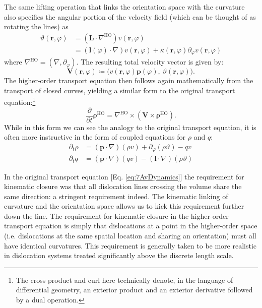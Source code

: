 The same lifting operation that links the orientation space with the
curvature also specifies the angular portion of the velocity field (which can be thought of as rotating the lines) as
\begin{align}
    \vartheta\left( \boldsymbol{r},\varphi \right) &= \left( \boldsymbol{L}\cdot\nabla^\text{HO} \right)v\left( \boldsymbol{r},\varphi \right)\\
    &= (\boldsymbol{l}(\varphi)\cdot\nabla)v\left( \boldsymbol{r},\varphi \right)+\kappa\left( \boldsymbol{r},\varphi \right)\partial_{\varphi}v\left( \boldsymbol{r},\varphi \right)
\end{align}
where \(\nabla^\text{HO} = \left( \nabla,\partial_{\varphi} \right)\). The
resulting total velocity vector is given by:
\begin{equation}\boldsymbol{V}\left( \boldsymbol{r},\varphi \right) \coloneqq \Big( v\left( \boldsymbol{r},\varphi \right)\boldsymbol{p}(\varphi),\ \vartheta\left( \boldsymbol{r},\varphi \right) \Big).\end{equation}
The higher-order transport equation then follows again mathematically
from the transport of closed curves, yielding a similar form to the
original transport equation:\footnote{The cross product and curl here technically denote, in the language of differential geometry, an exterior product and an exterior derivative followed by a dual operation.}
\begin{equation}
\frac{\partial}{\partial t}\boldsymbol{\rho}^\text{HO}=\nabla^\text{HO}\times\left( \boldsymbol{V} \times\boldsymbol{\rho}^\text{HO} \right).
\end{equation}
While in this form we can see the analogy to the original transport
equation, it is often more instructive in the form of coupled equations
for \(\rho\) and \(q\):
\begin{subequations}\label{eq:8hdcddev}
    \begin{align}
    \partial_{t}\rho &= \left( \boldsymbol{p} \cdot\nabla \right)(\rho v) + \partial_{\varphi}(\rho\vartheta) - qv\\
    \partial_{t}q &= \left( \boldsymbol{p }\cdot\nabla \right)(qv) - \left( \boldsymbol{l }\cdot\nabla \right)(\rho\vartheta)
\end{align}
\end{subequations}


In the original transport equation [Eq. \ref{eq:7AvDynamics}] the requirement for kinematic closure was that all dislocation lines crossing the volume share the same direction: a stringent requirement indeed. The kinematic linking of curvature and the orientation space allows us to kick this requirement further down the line. The requirement for kinematic closure in the higher-order transport equation is simply that dislocations at a point in the higher-order space (i.e. dislocations at the same spatial location and sharing an orientation) must all have identical curvatures. This requirement is generally taken to be more realistic in dislocation systems treated significantly above the discrete length scale.


